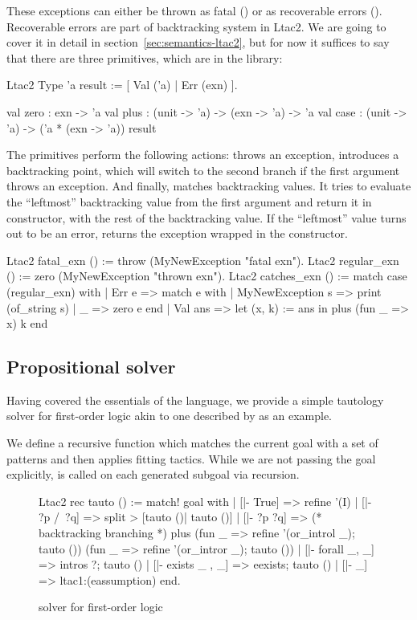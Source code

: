 These exceptions can either be thrown as fatal () or as recoverable errors ().
Recoverable errors are part of backtracking system in Ltac2.
We are going to cover it in detail in section~\ref{sec:semantics-ltac2}, but for now it suffices to say that there are three primitives, which are in the  library:

\begin{coq}
Ltac2 Type 'a result := [ Val ('a) | Err (exn) ].

val zero : exn -> 'a
val plus : (unit -> 'a) -> (exn -> 'a) -> 'a
val case : (unit -> 'a) -> ('a * (exn -> 'a)) result
\end{coq}

The primitives perform the following actions:  throws an exception,  introduces a backtracking point, which will switch to the second branch if the first argument throws an exception.
And finally,  matches backtracking values.
It tries to evaluate the ``leftmost'' backtracking value from the first argument and return it in  constructor, with the rest of the backtracking value.
If the ``leftmost'' value turns out to be an error,  returns the exception wrapped in the  constructor.

\begin{coq}
Ltac2 fatal_exn () := throw (MyNewException "fatal exn").
Ltac2 regular_exn () := zero (MyNewException "thrown exn").
Ltac2 catches_exn () := match case (regular_exn) with
| Err e => match e with
  | MyNewException s => print (of_string s)
  | _ => zero e
  end
| Val ans => let (x, k) := ans in
  plus (fun _ => x) k
end
\end{coq}

\subsection{Propositional solver}
\label{sec:propositional-solver}

Having covered the essentials of the language, we provide a simple tautology solver for first-order logic akin to one described by \citet{zilianiMtacMonadTyped2013} as an example.

We define a recursive function  which matches the current goal with a set of patterns and then applies fitting tactics.
While we are not passing the goal explicitly,  is called on each generated subgoal via recursion.

\begin{figure}[H]
\begin{coq}
Ltac2 rec tauto () :=
  match! goal with
  | [|- True] =>
    refine '(I)
  | [|- ?p /\ ?q] =>
    split > [tauto ()| tauto ()]
  | [|- ?p \/ ?q] =>
    (* backtracking branching *)
    plus (fun _ => refine '(or_introl _); tauto ())
         (fun _ => refine '(or_intror _); tauto ())
  | [|- forall _, _] =>
    intros ?; tauto ()
  | [|- exists _ , _] =>
    eexists; tauto ()
  | [|- _] => ltac1:(eassumption)
  end.
\end{coq}
\caption{solver for first-order logic}
\label{fig:ltac2-solver}
\end{figure}

